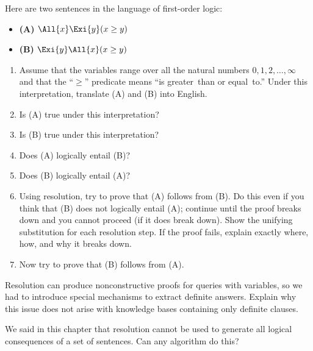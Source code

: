\begin{exercise}%
Here are two sentences in the language of first-order
logic:
\begin{itemize}
\item[] {\bf (A)} \(\All{x} \Exi{y} ( x \geq y )\)
\item[] {\bf (B)} \(\Exi{y} \All{x} ( x \geq y )\)
\end{itemize}
\begin{enumerate}
\item Assume that the variables range over all the natural numbers
\(0,1,2,\ldots, \infty\) and that the ``\(\geq\)'' predicate means
``is greater~than or equal~to.''  Under this interpretation, translate
(A) and (B) into English.
\item Is (A) true under this interpretation?
\item Is (B) true under this interpretation?
\item Does (A) logically entail (B)?  
\item Does (B) logically entail (A)?
\item Using resolution, try to prove that (A) follows from (B).  Do
this even if you think that (B) does not logically entail (A);
continue until the proof breaks down and you cannot proceed (if it
does break down). Show the unifying substitution for each resolution step.
If the proof fails, explain exactly where, how, and why it breaks
down.
\item Now try to prove that (B) follows from (A).  
\end{enumerate}
\end{exercise} 

\begin{exercise}
Resolution can produce nonconstructive proofs for queries with variables,
so we had to introduce special mechanisms to extract definite answers.
Explain why this issue does not arise with knowledge bases containing only definite clauses.
\end{exercise} 

\begin{exercise}
We said in this chapter that resolution cannot be used to generate all
logical consequences of a set of sentences.  Can any algorithm do
this?
\end{exercise} 







